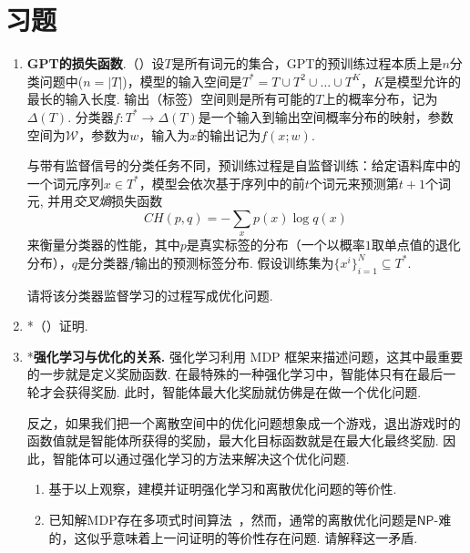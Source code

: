 \section{习题}

\begin{enumerate}[wide, labelindent=0pt]
    \item \textbf{GPT的损失函数}.（\cite{radfordImprovingLanguageUnderstanding}）设$T$是所有词元的集合，GPT的预训练过程本质上是$n$分类问题中($n = |T|$)，模型的输入空间是$T^\ast=T\cup T^2 \cup \dots \cup T^K$，$K$是模型允许的最长的输入长度. 输出（标签）空间则是所有可能的$T$上的概率分布，记为$\Delta(T)$. 分类器$f:T^\ast \to \Delta(T)$是一个输入到输出空间概率分布的映射，参数空间为$\mathcal W$，参数为$w$，输入为$x$的输出记为$f(x;w)$. 
    
    与带有监督信号的分类任务不同，预训练过程是自监督训练：给定语料库中的一个词元序列$x \in T^\ast$，模型会依次基于序列中的前$t$个词元来预测第$t+1$个词元, 并用\textit{交叉熵}损失函数
    \[CH(p,q) = -\sum_{x} p(x)\log q(x)\]
    来衡量分类器的性能，其中$p$是真实标签的分布（一个以概率$1$取单点值的退化分布），$q$是分类器$f$输出的预测标签分布. 假设训练集为$\{x^i\}_{i=1}^N\subseteq T^\ast$. 
    
    请将该分类器监督学习的过程写成优化问题.
    \item *\label{exercise:no-free-lunch}（\cite{wolpertNoFreeLunch1997}）证明.
    
    \item *\textbf{强化学习与优化的关系. }强化学习利用 MDP 框架来描述问题，这其中最重要的一步就是定义奖励函数. 在最特殊的一种强化学习中，智能体只有在最后一轮才会获得奖励. 此时，智能体最大化奖励就仿佛是在做一个优化问题. 
    
    反之，如果我们把一个离散空间中的优化问题想象成一个游戏，退出游戏时的函数值就是智能体所获得的奖励，最大化目标函数就是在最大化最终奖励. 因此，智能体可以通过强化学习的方法来解决这个优化问题. 
    
    \begin{enumerate}
        \item 基于以上观察，建模并证明强化学习和离散优化问题的等价性.
        \item 已知解MDP存在多项式时间算法~\cite{littmanComplexitySolvingMarkov1995}，然而，通常的离散优化问题是$\mathsf{NP}$-难的，这似乎意味着上一问证明的等价性存在问题. 请解释这一矛盾.
    \end{enumerate}
    

\end{enumerate}
